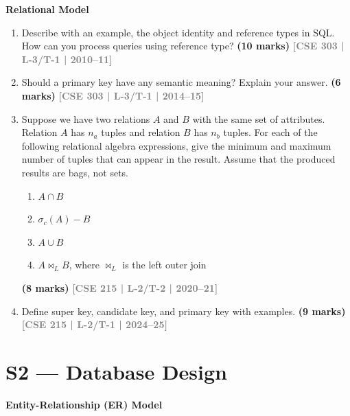 \documentclass[12pt,a3paper]{article}
\newcommand{\yr}[1]{\hfill\textcolor{gray}{\small\textbf{[#1]}}}
\newcommand{\mk}[1]{\textcolor{orange!70!black}{\small\textbf{(#1 marks)}}}
\newcommand{\subtopic}[2]{%
  \vspace{10pt}
  \noindent\begin{tcolorbox}[colback=#1!8,colframe=#1,boxrule=0.6pt,arc=4pt,
    left=6pt,right=6pt,top=4pt,bottom=4pt]
    \small\bfseries\textcolor{#1}{#2}
  \end{tcolorbox}
  \vspace{2pt}
}
\begin{document}
\subtopic{cA}{Relational Model}
\label{sub:s1-relational}

\begin{enumerate}

\item Describe with an example, the object identity and reference types in SQL. How can you process queries using reference type?
\mk{10} \yr{CSE 303 | L-3/T-1 | 2010--11}

\item Should a primary key have any semantic meaning? Explain your answer.
\mk{6} \yr{CSE 303 | L-3/T-1 | 2014--15}

\item Suppose we have two relations $A$ and $B$ with the same set of attributes. Relation $A$ has $n_a$ tuples and relation $B$ has $n_b$ tuples. For each of the following relational algebra expressions, give the minimum and maximum number of tuples that can appear in the result. Assume that the produced results are bags, not sets.
\begin{enumerate}
  \item $A \cap B$
  \item $\sigma_c(A) - B$
  \item $A \cup B$
  \item $A \bowtie_L B$, where $\bowtie_L$ is the left outer join
\end{enumerate}
\mk{8} \yr{CSE 215 | L-2/T-2 | 2020--21}

\item Define super key, candidate key, and primary key with examples.
\mk{9} \yr{CSE 215 | L-2/T-1 | 2024--25}

\end{enumerate}

\section{S2 --- Database Design}
\label{sec:S2}

\subtopic{cA}{Entity-Relationship (ER) Model}
\label{sub:s2-er}
\end{document}
